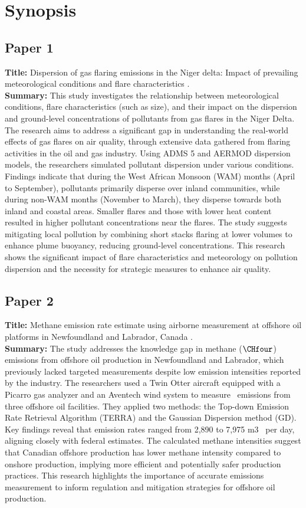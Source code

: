 \section*{Synopsis}

\subsection*{Paper 1}
\textbf{Title:} Dispersion of gas flaring emissions in the Niger delta: Impact of prevailing meteorological conditions and flare characteristics \cite{fawole2019dispersion}.\\
\textbf{Summary:} This study investigates the relationship between meteorological conditions, flare characteristics (such as size), and their impact on the dispersion and ground-level concentrations of pollutants from gas flares in the Niger Delta. The research aims to address a significant gap in understanding the real-world effects of gas flares on air quality, through extensive data gathered from flaring activities in the oil and gas industry. Using ADMS 5 and AERMOD dispersion models, the researchers simulated pollutant dispersion under various conditions. Findings indicate that during the West African Monsoon (WAM) months (April to September), pollutants primarily disperse over inland communities, while during non-WAM months (November to March), they disperse towards both inland and coastal areas. Smaller flares and those with lower heat content resulted in higher pollutant concentrations near the flares. The study suggests mitigating local pollution by combining short stacks flaring at lower volumes to enhance plume buoyancy, reducing ground-level concentrations. This research shows the significant impact of flare characteristics and meteorology on pollution dispersion and the necessity for strategic measures to enhance air quality.
\subsection*{Paper 2}
\textbf{Title:} Methane emission rate estimate using airborne measurement at offshore oil platforms in Newfoundland and Labrador, Canada \cite{khaleghi2023methane}.\\
\textbf{Summary:} The study addresses the knowledge gap in methane (\(\CHfour\)) emissions from offshore oil production in Newfoundland and Labrador, which previously lacked targeted measurements despite low emission intensities reported by the industry. The researchers used a Twin Otter aircraft equipped with a Picarro gas analyzer and an Aventech wind system to measure \CHfour\ emissions from three offshore oil facilities. They applied two methods: the Top-down Emission Rate Retrieval Algorithm (TERRA) and the Gaussian Dispersion method (GD). Key findings reveal that emission rates ranged from 2,890 to 7,975 m3 \CHfour\ per day, aligning closely with federal estimates. The calculated methane intensities suggest that Canadian offshore production has lower methane intensity compared to onshore production, implying more efficient and potentially safer production practices. This research highlights the importance of accurate emissions measurement to inform regulation and mitigation strategies for offshore oil production.


